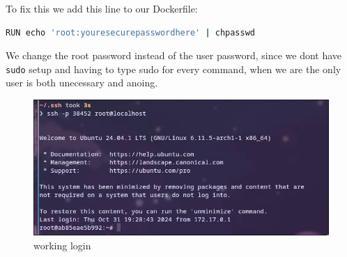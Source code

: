 \documentclass[a4paper]{article}
\begin{document}
To fix this we add this line to our Dockerfile:
\begin{lstlisting}[language=bash]
RUN echo 'root:youresecurepasswordhere' | chpasswd
\end{lstlisting}
We change the root password instead of the user password, since we dont have \texttt{sudo} setup and having to type sudo for every command, when we are the only user is both unecessary and anoing. 
\begin{figure}[h]
	\centering
	\includegraphics[scale=0.4]{images/workinglogin.png}
	\caption{working login}
\end{figure} \\
\newpage
\end{document}
